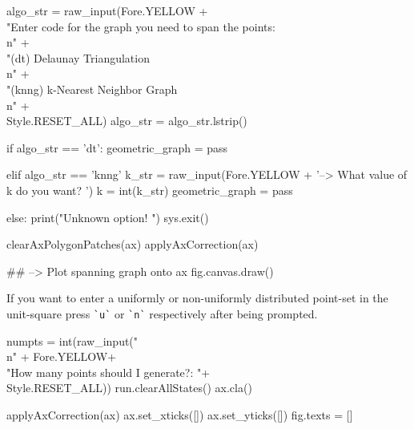 \nwenddocs{}\endmoddef\nwstartdeflinemarkup{}\nwenddeflinemarkup
algo_str = raw_input(Fore.YELLOW                             +\\
               "Enter code for the graph you need to span the points:\\n"  +\\
               "(dt)   Delaunay Triangulation           \\n"  +\\
               "(knng) k-Nearest Neighbor Graph           \\n"  +\\
               Style.RESET_ALL)
algo_str = algo_str.lstrip()

if algo_str == 'dt':
      geometric_graph = pass
      
elif algo_str == 'knng'
      k_str = raw_input(Fore.YELLOW + '--> What value of k do you want? ')
      k     = int(k_str)
      geometric_graph = pass

else:
      print("Unknown option! ")
      sys.exit()

clearAxPolygonPatches(ax)
applyAxCorrection(ax)

## --> Plot spanning graph onto ax
fig.canvas.draw()
\nwendcode{}\nwdocspar

If you want to enter a uniformly or non-uniformly distributed point-set in the unit-square press \verb|`u`| or \verb|`n`|
respectively after being prompted. 

\nwenddocs{}\endmoddef\nwstartdeflinemarkup{}\nwenddeflinemarkup
numpts = int(raw_input("\\n" + Fore.YELLOW+\\
                       "How many points should I generate?: "+\\
                       Style.RESET_ALL)) 
run.clearAllStates()
ax.cla()
               
applyAxCorrection(ax)
ax.set_xticks([])
ax.set_yticks([])
fig.texts = []
                 
